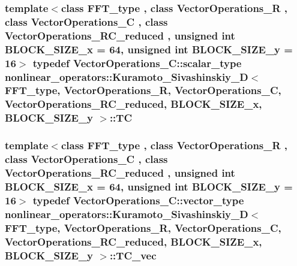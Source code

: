 \hypertarget{classnonlinear__operators_1_1Kuramoto__Sivashinskiy__2D_a293631e4e9624989416db9d9e74242ad}{
\subsubsection[{T\-C}]{\setlength{\rightskip}{0pt plus 5cm}template$<$class F\-F\-T\-\_\-type , class Vector\-Operations\-\_\-\-R , class Vector\-Operations\-\_\-\-C , class Vector\-Operations\-\_\-\-R\-C\-\_\-reduced , unsigned int B\-L\-O\-C\-K\-\_\-\-S\-I\-Z\-E\-\_\-x = 64, unsigned int B\-L\-O\-C\-K\-\_\-\-S\-I\-Z\-E\-\_\-y = 16$>$ typedef Vector\-Operations\-\_\-\-C\-::scalar\-\_\-type {\bf nonlinear\-\_\-operators\-::\-Kuramoto\-\_\-\-Sivashinskiy\-\_\-D}$<$ F\-F\-T\-\_\-type, Vector\-Operations\-\_\-\-R, Vector\-Operations\-\_\-\-C, Vector\-Operations\-\_\-\-R\-C\-\_\-reduced, B\-L\-O\-C\-K\-\_\-\-S\-I\-Z\-E\-\_\-x, B\-L\-O\-C\-K\-\_\-\-S\-I\-Z\-E\-\_\-y $>$\-::{\bf T\-C}}}\label{classnonlinear__operators_1_1Kuramoto__Sivashinskiy__2D_a293631e4e9624989416db9d9e74242ad}
\hypertarget{classnonlinear__operators_1_1Kuramoto__Sivashinskiy__2D_aa13f36a5401128a6e8b17a1676edb919}{
\subsubsection[{T\-C\-\_\-vec}]{\setlength{\rightskip}{0pt plus 5cm}template$<$class F\-F\-T\-\_\-type , class Vector\-Operations\-\_\-\-R , class Vector\-Operations\-\_\-\-C , class Vector\-Operations\-\_\-\-R\-C\-\_\-reduced , unsigned int B\-L\-O\-C\-K\-\_\-\-S\-I\-Z\-E\-\_\-x = 64, unsigned int B\-L\-O\-C\-K\-\_\-\-S\-I\-Z\-E\-\_\-y = 16$>$ typedef Vector\-Operations\-\_\-\-C\-::vector\-\_\-type {\bf nonlinear\-\_\-operators\-::\-Kuramoto\-\_\-\-Sivashinskiy\-\_\-D}$<$ F\-F\-T\-\_\-type, Vector\-Operations\-\_\-\-R, Vector\-Operations\-\_\-\-C, Vector\-Operations\-\_\-\-R\-C\-\_\-reduced, B\-L\-O\-C\-K\-\_\-\-S\-I\-Z\-E\-\_\-x, B\-L\-O\-C\-K\-\_\-\-S\-I\-Z\-E\-\_\-y $>$\-::{\bf T\-C\-\_\-vec}}}\label{classnonlinear__operators_1_1Kuramoto__Sivashinskiy__2D_aa13f36a5401128a6e8b17a1676edb919}
